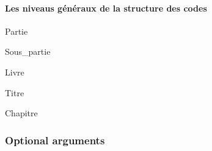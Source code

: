 \documentclass[
  oneside]{book}
\begin{document}
\hypertarget{les-niveaus-guxe9nuxe9raux-de-la-structure-des-codes}{%
\paragraph{Les niveaus généraux de la structure des codes}\label{les-niveaus-guxe9nuxe9raux-de-la-structure-des-codes}}

Partie

Sous\_partie

Livre

Titre

Chapitre

\hypertarget{optional-arguments}{%
\subsubsection{Optional arguments}\label{optional-arguments}}
\end{document}
